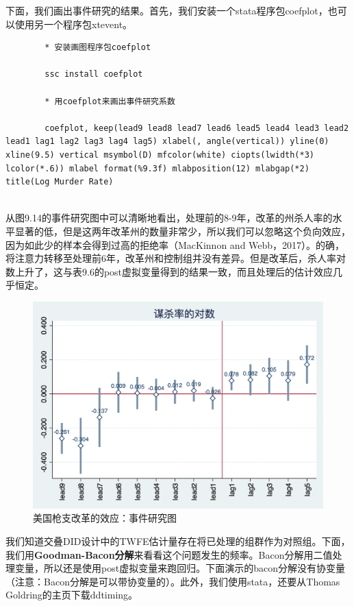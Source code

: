 \documentclass[cn,12pt,math=newtx,citestyle=gb7714-2015,bibstyle=gb7714-2015]{elegantbook}
\begin{document}
    
    下面，我们画出事件研究的结果。首先，我们安装一个stata程序包coefplot，也可以使用另一个程序包xtevent。
    
    \begin{lstlisting}
        * 安装画图程序包coefplot
        
    	ssc install coefplot
        
        * 用coefplot来画出事件研究系数
        
    	coefplot, keep(lead9 lead8 lead7 lead6 lead5 lead4 lead3 lead2 lead1 lag1 lag2 lag3 lag4 lag5) xlabel(, angle(vertical)) yline(0) xline(9.5) vertical msymbol(D) mfcolor(white) ciopts(lwidth(*3) lcolor(*.6)) mlabel format(%9.3f) mlabposition(12) mlabgap(*2) title(Log Murder Rate) 
    	
    \end{lstlisting}
    
    从图9.14的事件研究图中可以清晰地看出，处理前的8-9年，改革的州杀人率的水平显著的低，但是这两年改革州的数量非常少，所以我们可以忽略这个负向效应，因为如此少的样本会得到过高的拒绝率（MacKinnon and Webb，2017）。的确，将注意力转移至处理前6年，改革州和控制组并没有差异。但是改革后，杀人率对数上升了，这与表9.6的post虚拟变量得到的结果一致，而且处理后的估计效应几乎恒定。
    
    \begin{figure}[tbph]
    	\centering
    	\includegraphics[width=1\linewidth]{event_study_plot}
    	\caption{美国枪支改革的效应：事件研究图}
    	\label{fig:event_study_plot}
    \end{figure}
    
    我们知道交叠DID设计中的TWFE估计量存在将已处理的组群作为对照组。下面，我们用\textbf{Goodman-Bacon分解}来看看这个问题发生的频率。Bacon分解用二值处理变量，所以还是使用post虚拟变量来跑回归。下面演示的bacon分解没有协变量（注意：Bacon分解是可以带协变量的）。此外，我们使用stata，还要从Thomas Goldring的主页下载ddtiming。
    
\end{document}
